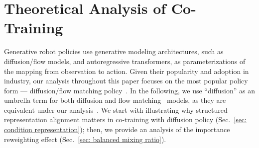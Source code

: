 \section{Theoretical Analysis of Co-Training}
\label{sec: theoretical insight}

Generative robot policies use generative modeling architectures, such as diffusion/flow models, and autoregressive transformers, as parameterizations of the mapping from observation to action.
Given their popularity and adoption in industry, our analysis throughout this paper focuses on the most popular policy form --- diffusion/flow matching policy~\cite{chi2025diffusion}. 
In the following, we use ``diffusion'' as an umbrella term for both diffusion and flow matching~\cite{liu2022flow} models, as they are equivalent under our analysis~\cite{gao2025diffusion}.
We start with illustrating why structured representation alignment matters in co-training with diffusion policy (Sec.~\ref{sec: condition representation}); then, we provide an analysis of the importance reweighting effect (Sec.~\ref{sec: balanced mixing ratio}).

